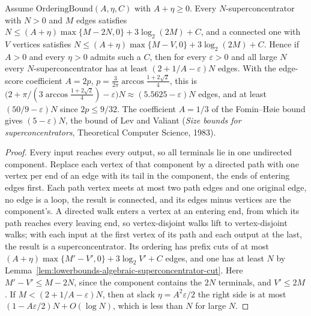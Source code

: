 \begin{theorem}
  \label{thm:lowerbounds-algebraic-superconcentrator}
  \leanok
  Assume $\mathrm{OrderingBound}(A,\eta,C)$ with $A+\eta\ge0$. Every $N$-superconcentrator
  with $N>0$ and $M$ edges satisfies
  $N\le(A+\eta)\max\{M-2N,0\}+3\log_2(2M)+C$, and a connected one with $V$ vertices satisfies
  $N\le(A+\eta)\max\{M-V,0\}+3\log_2(2M)+C$. Hence if $A>0$ and every $\eta>0$ admits such a
  $C$, then for every $\varepsilon>0$ and all large $N$ every $N$-superconcentrator has at
  least $(2+1/A-\varepsilon)N$ edges. With the edge-score coefficient
  $A=2p$, $p=\tfrac{3}{2\pi}\arccos\tfrac{1+2\sqrt2}{4}$, this is
  $\bigl(2+\pi/(3\arccos\tfrac{1+2\sqrt2}{4})-\varepsilon\bigr)N\approx(5.5625-\varepsilon)N$
  edges, and at least $(50/9-\varepsilon)N$ since $2p\le9/32$. The coefficient $A=1/3$ of the
  Fomin--H{\o}ie bound gives $(5-\varepsilon)N$, the bound of Lev and Valiant
  (\emph{Size bounds for superconcentrators}, Theoretical Computer Science, 1983).
\end{theorem}
\begin{proof}
  \leanok
  Every input reaches every output, so all terminals lie in one undirected component. Replace
  each vertex of that component by a directed path with one vertex per end of an edge with
  its tail in the component, the ends of entering edges first. Each path vertex meets at most
  two path edges and one original edge, no edge is a loop, the result is connected, and its
  edges minus vertices are the component's. A directed walk enters a vertex at an entering
  end, from which its path reaches every leaving end, so vertex-disjoint walks lift to
  vertex-disjoint walks; with each input at the first vertex of its path and each output at
  the last, the result is a superconcentrator. Its ordering has prefix cuts of at most
  $(A+\eta)\max\{M'-V',0\}+3\log_2V'+C$ edges, and one has at least $N$ by
  Lemma~\ref{lem:lowerbounds-algebraic-superconcentrator-cut}. Here $M'-V'\le M-2N$, since
  the component contains the $2N$ terminals, and $V'\le2M$. If $M<(2+1/A-\varepsilon)N$, then
  at slack $\eta=A^2\varepsilon/2$ the right side is at most
  $(1-A\varepsilon/2)N+O(\log N)$, which is less than $N$ for large $N$.
\end{proof}

